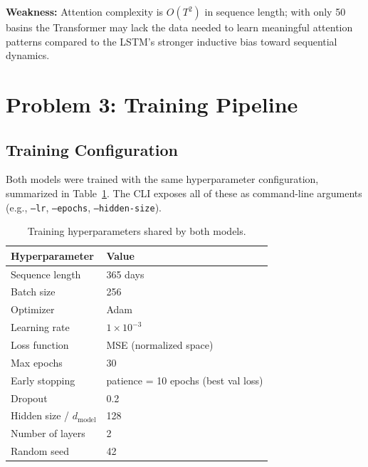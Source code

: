 \documentclass[11pt, letterpaper]{article}
\begin{document}
\textbf{Weakness:} Attention complexity is $O(T^2)$ in sequence length;
with only 50 basins the Transformer may lack the data needed to learn
meaningful attention patterns compared to the LSTM's stronger inductive bias
toward sequential dynamics.

\section{Problem 3: Training Pipeline}

\subsection{Training Configuration}

Both models were trained with the same hyperparameter configuration, summarized
in Table~\ref{tab:training}.  The CLI exposes all of these as command-line
arguments (e.g., \texttt{--lr}, \texttt{--epochs}, \texttt{--hidden-size}).

\begin{table}[H]
    \centering
    \caption{Training hyperparameters shared by both models.}
    \label{tab:training}
    \begin{tabular}{ll}
        \toprule
        Hyperparameter & Value \\
        \midrule
        Sequence length     & 365 days \\
        Batch size          & 256 \\
        Optimizer           & Adam \\
        Learning rate       & $1\times10^{-3}$ \\
        Loss function       & MSE (normalized space) \\
        Max epochs          & 30 \\
        Early stopping      & patience = 10 epochs (best val loss) \\
        Dropout             & 0.2 \\
        Hidden size / $d_\text{model}$ & 128 \\
        Number of layers    & 2 \\
        Random seed         & 42 \\
        \bottomrule
    \end{tabular}
\end{table}
\end{document}
